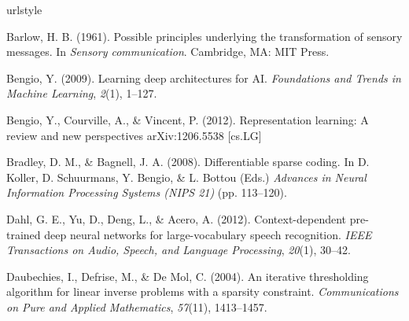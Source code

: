 \documentclass{article} %
\begin{document}
\begin{thebibliography}{100}
\providecommand{\natexlab}[1]{#1}
\expandafter\ifx\csname urlstyle\endcsname\relax
  \providecommand{\doi}[1]{doi:\discretionary{}{}{}#1}\else
  \providecommand{\doi}{doi:\discretionary{}{}{}\begingroup
  \urlstyle{rm}\Url}\fi


Barlow, H. B. (1961). 
\newblock Possible principles underlying the transformation of sensory messages. 
\newblock In \emph{Sensory communication}. Cambridge, MA: MIT Press.

Bengio, Y. (2009). 
\newblock Learning deep architectures for AI. 
\newblock \emph{Foundations and Trends in Machine Learning}, \emph{2}(1), 1--127.

Bengio, Y., Courville, A., \& Vincent, P. (2012).
\newblock Representation learning: A review and new perspectives
\newblock arXiv:1206.5538 [cs.LG]


Bradley, D. M., \& Bagnell, J. A. (2008).
\newblock Differentiable sparse coding.
\newblock In D. Koller, D. Schuurmans, Y. Bengio, \& L. Bottou (Eds.) \emph{Advances in Neural Information Processing Systems (NIPS 21)} (pp. 113--120).

Dahl, G. E., Yu, D., Deng, L., \& Acero, A. (2012). 
\newblock Context-dependent pre-trained deep neural networks for large-vocabulary speech recognition. 
\newblock \emph{IEEE Transactions on Audio, Speech, and Language Processing}, \emph{20}(1), 30--42.

Daubechies, I., Defrise, M., \& De Mol, C. (2004). 
\newblock An iterative thresholding algorithm for linear inverse problems with a sparsity constraint. 
\newblock \emph{Communications on Pure and Applied Mathematics}, \emph{57}(11), 1413--1457.



\end{thebibliography}
\end{document}
